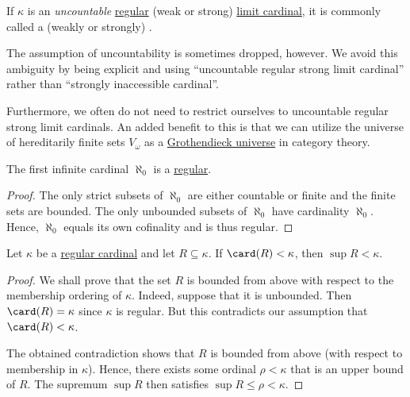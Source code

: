 \begin{remark}\label{rem:strongly_inaccessible_cardinal}
  If \( \kappa \) is an \emph{uncountable} \hyperref[def:regular_cardinal]{regular} (weak or strong) \hyperref[def:successor_and_limit_cardinal]{limit cardinal}, it is commonly called a (weakly or strongly) .

  The assumption of uncountability is sometimes dropped, however. We avoid this ambiguity by being explicit and using \enquote{uncountable regular strong limit cardinal} rather than \enquote{strongly inaccessible cardinal}.

  Furthermore, we often do not need to restrict ourselves to uncountable regular strong limit cardinals. An added benefit to this is that we can utilize the universe of hereditarily finite sets \hyperref[def:universe_of_hereditary_finite_sets]{\( V_\omega \)} as a \hyperref[def:grothendieck_universe]{Grothendieck universe} in category theory.
\end{remark}

\begin{proposition}\label{thm:aleph_zero_is_regular}
  The first infinite cardinal \( \aleph_0 \) is a \hyperref[def:regular_cardinal]{regular}.
\end{proposition}
\begin{proof}
  The only strict subsets of \( \aleph_0 \) are either countable or finite and the finite sets are bounded. The only unbounded subsets of \( \aleph_0 \) have cardinality \( \aleph_0 \). Hence, \( \aleph_0 \) equals its own cofinality and is thus regular.
\end{proof}

\begin{lemma}\label{thm:regular_cardinal_stage_supremum_lemma}
  Let \( \kappa \) be a \hyperref[def:regular_cardinal]{regular cardinal} and let \( R \subseteq \kappa \). If \( \card(R) < \kappa \), then \( \sup R < \kappa \).
\end{lemma}
\begin{proof}
  We shall prove that the set \( R \) is bounded from above with respect to the membership ordering of \( \kappa \). Indeed, suppose that it is unbounded. Then \( \card(R) = \kappa \) since \( \kappa \) is regular. But this contradicts our assumption that \( \card(R) < \kappa \).

  The obtained contradiction shows that \( R \) is bounded from above (with respect to membership in \( \kappa \)). Hence, there exists some ordinal \( \rho < \kappa \) that is an upper bound of \( R \). The supremum \( \sup R \) then satisfies \( \sup R \leq \rho < \kappa \).
\end{proof}

